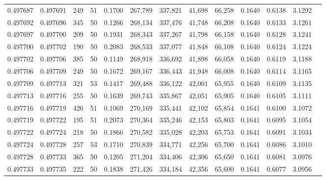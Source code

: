 \begin{tabular}{rrrrrrrrrrrrr}
0.497687 & 0.497691 & 249 &  51 &                                     0.1700 & 267,789 & 337,821 &  41,698 &  66,258 & 0.1640 & 0.6138 & 3.1292 \\
0.497692 & 0.497696 & 345 &  50 &                                     0.1266 & 268,134 & 337,476 &  41,748 &  66,208 & 0.1640 & 0.6133 & 3.1261 \\
0.497697 & 0.497700 & 209 &  50 &                                     0.1931 & 268,343 & 337,267 &  41,798 &  66,158 & 0.1640 & 0.6128 & 3.1241 \\
0.497700 & 0.497702 & 190 &  50 &                                     0.2083 & 268,533 & 337,077 &  41,848 &  66,108 & 0.1640 & 0.6124 & 3.1224 \\
0.497702 & 0.497706 & 385 &  50 &                                     0.1149 & 268,918 & 336,692 &  41,898 &  66,058 & 0.1640 & 0.6119 & 3.1188 \\
0.497706 & 0.497709 & 249 &  50 &                                     0.1672 & 269,167 & 336,443 &  41,948 &  66,008 & 0.1640 & 0.6114 & 3.1165 \\
0.497709 & 0.497713 & 321 &  53 &                                     0.1417 & 269,488 & 336,122 &  42,001 &  65,955 & 0.1640 & 0.6109 & 3.1135 \\
0.497713 & 0.497716 & 255 &  50 &                                     0.1639 & 269,743 & 335,867 &  42,051 &  65,905 & 0.1640 & 0.6105 & 3.1111 \\
0.497716 & 0.497719 & 426 &  51 &                                     0.1069 & 270,169 & 335,441 &  42,102 &  65,854 & 0.1641 & 0.6100 & 3.1072 \\
0.497719 & 0.497722 & 195 &  51 &                                     0.2073 & 270,364 & 335,246 &  42,153 &  65,803 & 0.1641 & 0.6095 & 3.1054 \\
0.497722 & 0.497724 & 218 &  50 &                                     0.1866 & 270,582 & 335,028 &  42,203 &  65,753 & 0.1641 & 0.6091 & 3.1034 \\
0.497724 & 0.497728 & 257 &  53 &                                     0.1710 & 270,839 & 334,771 &  42,256 &  65,700 & 0.1641 & 0.6086 & 3.1010 \\
0.497728 & 0.497733 & 365 &  50 &                                     0.1205 & 271,204 & 334,406 &  42,306 &  65,650 & 0.1641 & 0.6081 & 3.0976 \\
0.497733 & 0.497735 & 222 &  50 &                                     0.1838 & 271,426 & 334,184 &  42,356 &  65,600 & 0.1641 & 0.6077 & 3.0956 \\

\end{tabular}
